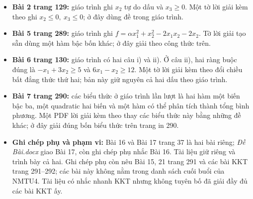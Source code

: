 \documentclass[11pt,a4paper]{article}
\begin{document}
\begin{itemize}
\item \textbf{Bài 2 trang 129:} giáo trình ghi \(x_2\) tự do dấu và \(x_3\ge0\). Một tờ lời giải kèm theo ghi \(x_2\le0,\ x_3\le0\); ở đây dùng đề trong giáo trình.
\item \textbf{Bài 5 trang 289:} giáo trình ghi \(f=\alpha x_1^2+x_2^2-2x_1x_2-2x_2\). Tờ lời giải tạo sẵn dùng một hàm bậc bốn khác; ở đây giải theo công thức trên.
\item \textbf{Bài 6 trang 130:} giáo trình có hai câu i) và ii). Ở câu ii), hai ràng buộc đúng là \(-x_1+3x_2\ge5\) và \(6x_1-x_2\ge12\). Một tờ lời giải kèm theo đổi chiều bất đẳng thức thứ hai; bản này giữ nguyên cả hai dấu theo giáo trình.
\item \textbf{Bài 7 trang 290:} các biểu thức ở giáo trình lần lượt là hai hàm một biến bậc ba, một quadratic hai biến và một hàm có thể phân tích thành tổng bình phương. Một PDF lời giải kèm theo thay các biểu thức này bằng những đề khác; ở đây giải đúng bốn biểu thức trên trang in 290.
\item \textbf{Ghi chép phụ và phạm vi:} Bài 16 và Bài 17 trang 37 là hai bài riêng; \textit{Đề Bài.docx} giao Bài 17, còn ghi chép phụ nhắc Bài 16. Tài liệu giữ riêng và trình bày cả hai. Ghi chép phụ còn nêu Bài 15, 21 trang 291 và các bài KKT trang 291--292; các bài này không nằm trong danh sách cuối buổi của NMTU4. Tài liệu có nhắc nhanh KKT nhưng không tuyên bố đã giải đầy đủ các bài KKT ấy.
\end{itemize}
\end{document}
